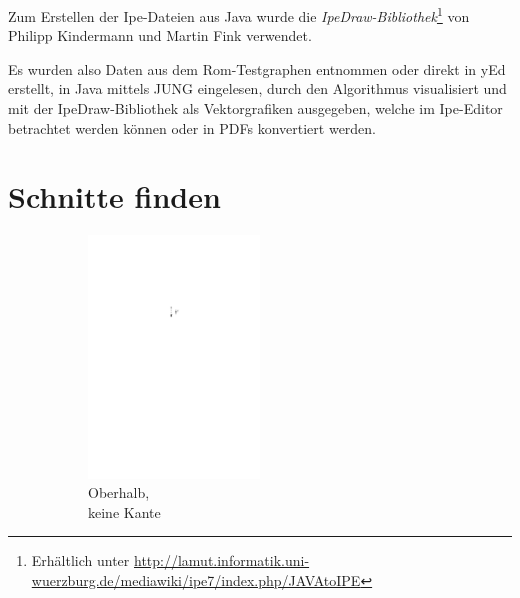 \documentclass[a4paper]{scrreprt}
\theoremstyle{definition}
\begin{document}
Zum Erstellen der Ipe-Dateien aus Java wurde die \emph{IpeDraw-Bibliothek}\footnote{Erhältlich unter \url{http://lamut.informatik.uni-wuerzburg.de/mediawiki/ipe7/index.php/JAVAtoIPE}} von Philipp Kindermann und Martin Fink verwendet.

Es wurden also Daten aus dem Rom-Testgraphen entnommen oder direkt in yEd erstellt, in Java mittels JUNG eingelesen, durch den Algorithmus visualisiert und mit der IpeDraw-Bibliothek als Vektorgrafiken ausgegeben, welche im Ipe-Editor betrachtet werden können oder in PDFs konvertiert werden.

\section{Schnitte finden}

\begin{figure}[h]
        \centering
        \begin{subfigure}[b]{0.2\textwidth}
                \includegraphics[width=0.5\textwidth]{schnitt_finden_top_none}
                \caption{Oberhalb,\\ keine Kante}
                \label{fig:cutfinding_top_none}
        \end{subfigure}%
        \quad
        \begin{subfigure}[b]{0.2\textwidth}

\end{subfigure}
\end{figure}
\end{document}
